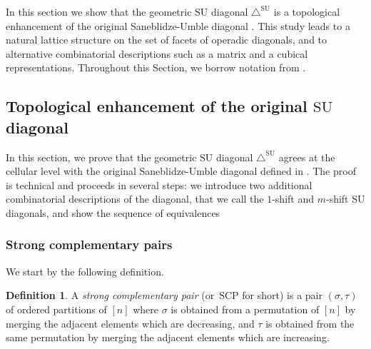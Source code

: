 \documentclass{amsart}
\newcommand{\darkblue}{\color{darkblue}} %
\theoremstyle{definition}
\newtheorem{definition}[theorem]{Definition}
\newcommand{\defn}[1]{\textsl{\darkblue #1}} %
\newcommand{\SU}{\mathrm{SU}}
\newcommand{\SUD}{\triangle^{\mathrm{SU}}}
\newcommand{\SCP}{\mathrm{SCP}}
\begin{document}
In this section we show that the geometric $\SU$ diagonal $\SUD$ is a topological enhancement of the original Saneblidze-Umble diagonal \cite{SaneblidzeUmble}.
This study leads to a natural lattice structure on the set of facets of operadic diagonals, and to alternative combinatorial descriptions such as a matrix and a cubical representations. 
Throughout this Section, we borrow notation from \cite{SaneblidzeUmble-comparingDiagonals}.


\subsection{Topological enhancement of the original $\SU$ diagonal}

In this section, we prove that the geometric $\SU$ diagonal $\SUD$ agrees at the cellular level with the original Saneblidze-Umble diagonal defined in \cite{SaneblidzeUmble}.
The proof is technical and proceeds in several steps: we introduce two additional combinatorial descriptions of the diagonal, that we call the $1$-shift and $m$-shift $\SU$ diagonals, and show the sequence of equivalences
\begin{center}
\end{center}


\subsubsection{Strong complementary pairs}

We start by the following definition.

\begin{definition}
\label{def:strong-complementary-pairs}
A \defn{strong complementary pair} (or~\defn{$\SCP$} for short) is a pair $(\sigma,\tau)$ of ordered partitions of $[n]$ where $\sigma$ is obtained from a permutation of $[n]$ by merging the adjacent elements which are decreasing, and $\tau$ is obtained from the same permutation by merging the adjacent elements which are increasing.
\end{definition}
\end{document}
